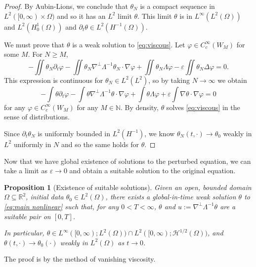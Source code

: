 \documentclass[11pt]{amsart}
\newtheorem{proposition}[theorem]{Proposition}
\theoremstyle{remark}
\theoremstyle{definition}
\newcommand{\R}{\mathbb{R}}
\newcommand{\N}{\mathbb{N}}
\newcommand{\eps}{\varepsilon}
\newcommand{\del}{\partial}
\newcommand{\grad}{\nabla}
\newcommand{\Laplace}{\Delta}
\newcommand{\Ctest}{C_c^\infty}
\newcommand{\HD}{\mathcal{H}}
\begin{document}
\begin{proof}
By Aubin-Lions, we conclude that $\theta_N$ is a compact sequence in $L^2([0,\infty)\times\Omega)$ and so it has an $L^2$ limit $\theta$.  This limit $\theta$ is in $L^\infty(L^2(\Omega))$ and $L^2(H_0^1(\Omega))$ and $\del_t \theta \in L^2(H^{-1}(\Omega))$.  

We must prove that $\theta$ is a weak solution to \eqref{eq:viscous}.  Let $\varphi \in \Ctest(W_M)$ for some $M$.  For $N \geq M$, 
\[ - \iint \theta_N \del_t\varphi - \iint \theta_N \grad^{\perp} \Lambda^{-1} \theta_N \cdot \grad \varphi + \iint \theta_N \Lambda \varphi - \eps \iint \theta_N \Laplace \varphi = 0. \]
This expression is continuous for $\theta_N \in L^2(L^2)$, so by taking $N \to \infty$ we obtain 
\[ - \int \theta \del_t\varphi - \int \theta \grad^{\perp} \Lambda^{-1} \theta \cdot \grad \varphi + \int \theta \Lambda \varphi + \eps \int \grad \theta \cdot \grad \varphi = 0 \]
for any $\varphi \in \Ctest(W_M)$ for any $M \in \N$.  By density, $\theta$ solves \eqref{eq:viscous} in the sense of distributions.  

Since $\del_t \theta_N$ is uniformly bounded in $L^2(H^{-1})$, we know $\theta_N(t,\cdot) \to \theta_0$ weakly in $L^2$ uniformly in $N$ and so the same holds for $\theta$.  
\end{proof}

Now that we have global existence of solutions to the perturbed equation, we can take a limit as $\eps \to 0$ and obtain a suitable solution to the original equation.  

\begin{proposition}[Existence of suitable solutions]
Given an open, bounded domain $\Omega \subseteq \R^2$, initial data $\theta_0 \in L^2(\Omega)$, there exists a global-in-time weak solution $\theta$ to \eqref{eq:main nonlinear} such that, for any $0 < T < \infty$, $\theta$ and $u := \grad^\perp \Lambda^{-1} \theta$ are a suitable pair on $[0,T]$.  

In particular, $\theta \in L^\infty([0,\infty);L^2(\Omega)) \cap L^2([0,\infty);\HD^{1/2}(\Omega))$, and $\theta(t,\cdot) \to \theta_0(\cdot)$ weakly in $L^2(\Omega)$ as $t \to 0$.  
\end{proposition}

The proof is by the method of vanishing viscosity.  
\end{document}
